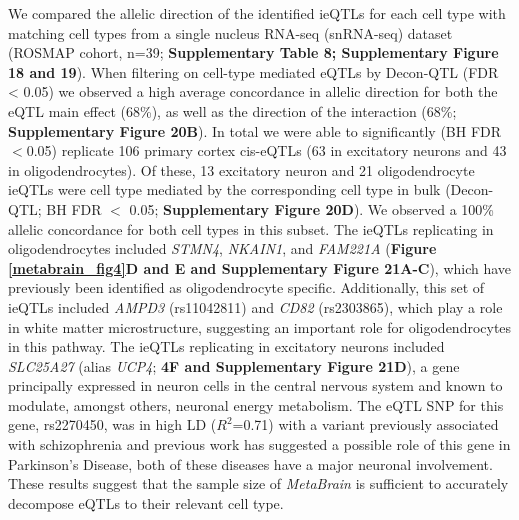 We compared the allelic direction of the identified ieQTLs for each cell type with matching cell types from a single nucleus RNA-seq (snRNA-seq) dataset (ROSMAP cohort, n=39; \textbf{Supplementary Table 8; Supplementary Figure 18 and 19})\cite{mathysSinglecellTranscriptomicAnalysis2019}. When filtering on cell-type mediated eQTLs by Decon-QTL (FDR < 0.05) we observed a high average concordance in allelic direction for both the eQTL main effect (68\%), as well as the direction of the interaction (68\%; \textbf{Supplementary Figure 20B}). In total we were able to significantly (BH FDR$<$0.05) replicate 106 primary cortex cis-eQTLs (63 in excitatory neurons and 43 in oligodendrocytes). Of these, 13 excitatory neuron and 21 oligodendrocyte ieQTLs were cell type mediated by the corresponding cell type in bulk (Decon-QTL; BH FDR $<$ 0.05; \textbf{Supplementary Figure 20D}). We observed a 100\% allelic concordance for both cell types in this subset. The ieQTLs replicating in oligodendrocytes included \emph{STMN4}, \emph{NKAIN1}, and \emph{FAM221A} (\textbf{Figure \ref{metabrain_fig4}D and E and Supplementary Figure 21A-C}), which have previously been identified as oligodendrocyte specific\cite{ngUsingTranscriptomicHidden2019}. Additionally, this set of ieQTLs included \emph{AMPD3} (rs11042811) and \emph{CD82} (rs2303865), which play a role in white matter microstructure\cite{zhaoLargescaleGWASReveals2019}, suggesting an important role for oligodendrocytes in this pathway. The ieQTLs replicating in excitatory neurons included \emph{SLC25A27} (alias \emph{UCP4}; \textbf{4F and Supplementary Figure 21D}), a gene principally expressed in neuron cells\cite{smorodchenkoComparativeAnalysisUncoupling2009} in the central nervous system\cite{ramsdenHumanNeuronalUncoupling2012} and known to modulate, amongst others, neuronal energy metabolism\cite{liuMitochondrialUCP4Mediates2006}. The eQTL SNP for this gene, rs2270450, was in high LD ($R^2$=0.71) with a variant previously associated with schizophrenia\cite{yasunoSynergisticAssociationMitochondrial2007} and previous work has suggested a possible role of this gene in Parkinson’s Disease\cite{ramsdenHumanNeuronalUncoupling2012,hoMitochondrialNeuronalUncoupling2012}, both of these diseases have a major neuronal involvement. These results suggest that the sample size of \emph{MetaBrain} is sufficient to accurately decompose eQTLs to their relevant cell type. 

